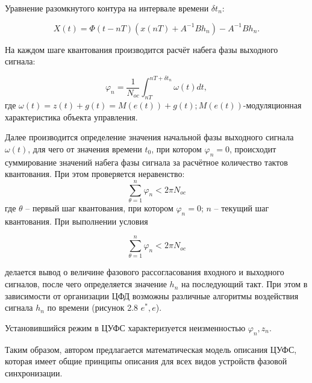 Уравнение разомкнутого контура на интервале времени $\delta t_n$: \par
\begin{equation}
\label{eq:equation2_20}
X(t)=\Phi(t-nT)(x(nT)+A^{-1}Bh_n)-A^{-1}Bh_n.
\end{equation}\par
На каждом шаге квантования производится расчёт набега фазы выходного сигнала:\par
\begin{equation}
\label{eq:equation2_21}
\varphi_n=\frac{1}{N_{oc}}\int_{nT}^{nT+\delta t_n}\omega(t)dt,
\end{equation}
\noindent где $\omega(t)=z(t)+g(t)=M(e(t))+g(t); M(e(t))$-модуляционная характеристика объекта управления. \par
Далее производится определение значения начальной фазы выходного сигнала $\omega(t)$, для чего от значения времени $t_0$, при котором $\varphi_n=0$, происходит суммирование значений набега фазы сигнала за расчётное количество тактов квантования. При этом проверяется неравенство:
\begin{equation}
\label{eq:equation2_22}
\sum^{n}_{\theta=1}\varphi_n<2\pi N_{oc}
\end{equation}
\noindent  где $\theta$ – первый шаг квантования, при котором $\varphi_n=0$; $n$ – текущий шаг квантования. При выполнении условия \par
\begin{equation}
\label{eq:equation2_23}
\sum^{n}_{\theta=1}\varphi_n<2\pi N_{oc}
\end{equation}\par
\noindent делается вывод о величине фазового рассогласования входного и выходного сигналов, после чего определяется значение $h_n$ на последующий такт. При этом в зависимости от организации ЦФД возможны различные алгоритмы воздействия сигнала $h_n$ по времени (рисунок 2.8 $e^*,e$). \par
Установившийся режим в ЦУФС характеризуется неизменностью $\varphi_n, z_n$.\par
Таким образом, автором предлагается математическая модель описания ЦУФС, которая имеет общие принципы описания для всех видов устройств фазовой синхронизации.
